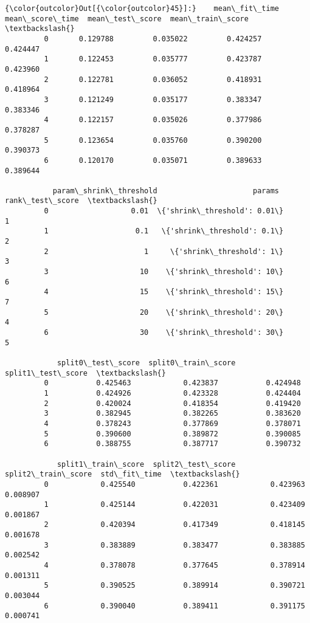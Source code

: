 \documentclass[11pt]{article}
\begin{document}
            \begin{Verbatim}[commandchars=\\\{\}]
{\color{outcolor}Out[{\color{outcolor}45}]:}    mean\_fit\_time  mean\_score\_time  mean\_test\_score  mean\_train\_score  \textbackslash{}
         0       0.129788         0.035022         0.424257          0.424447   
         1       0.122453         0.035777         0.423787          0.423960   
         2       0.122781         0.036052         0.418931          0.418964   
         3       0.121249         0.035177         0.383347          0.383346   
         4       0.122157         0.035026         0.377986          0.378287   
         5       0.123654         0.035760         0.390200          0.390373   
         6       0.120170         0.035071         0.389633          0.389644   
         
           param\_shrink\_threshold                      params  rank\_test\_score  \textbackslash{}
         0                   0.01  \{'shrink\_threshold': 0.01\}                1   
         1                    0.1   \{'shrink\_threshold': 0.1\}                2   
         2                      1     \{'shrink\_threshold': 1\}                3   
         3                     10    \{'shrink\_threshold': 10\}                6   
         4                     15    \{'shrink\_threshold': 15\}                7   
         5                     20    \{'shrink\_threshold': 20\}                4   
         6                     30    \{'shrink\_threshold': 30\}                5   
         
            split0\_test\_score  split0\_train\_score  split1\_test\_score  \textbackslash{}
         0           0.425463            0.423837           0.424948   
         1           0.424926            0.423328           0.424404   
         2           0.420024            0.418354           0.419420   
         3           0.382945            0.382265           0.383620   
         4           0.378243            0.377869           0.378071   
         5           0.390600            0.389872           0.390085   
         6           0.388755            0.387717           0.390732   
         
            split1\_train\_score  split2\_test\_score  split2\_train\_score  std\_fit\_time  \textbackslash{}
         0            0.425540           0.422361            0.423963      0.008907   
         1            0.425144           0.422031            0.423409      0.001867   
         2            0.420394           0.417349            0.418145      0.001678   
         3            0.383889           0.383477            0.383885      0.002542   
         4            0.378078           0.377645            0.378914      0.001311   
         5            0.390525           0.389914            0.390721      0.003044   
         6            0.390040           0.389411            0.391175      0.000741   
         

\end{Verbatim}
\end{document}
